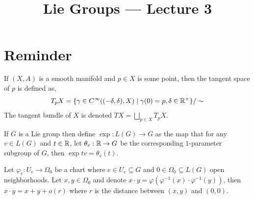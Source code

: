 
\title{Lie Groups --- Lecture 3}
\setcounter{secnumdepth}{2}

\usepackage{fancyhdr}
\pagestyle{fancy}
\renewcommand{\headrulewidth}{0pt}


\maketitle

\section{Reminder}
\begin{definition}
	If $(X, A)$ is a smooth manifold and $p \in X$ is some point, then the tangent space of $p$ is defined as,
	\[
		T_p X
		= \{ \gamma \in C^\infty((-\delta, \delta), X) \mid \gamma(0) = p, \delta \in \mathbb{R}^+ \} / \sim
	\]
	The tangent bundle of $X$ is denoted $T X = \bigsqcup_{p \in X} T_p X$.
\end{definition}
\begin{definition}
	If $G$ is a Lie group then define $\exp : L(G) \to G$ as the map that for any $v \in L(G)$ and $t \in \mathbb{R}$,
	let $\theta_v : \mathbb{R} \to G$ be the corresponding $1$-parameter subgroup of $G$, then $\exp tv = \theta_v(t)$.
\end{definition}
\begin{proposition}
	Let $\varphi_e : U_e \to \Omega_0$ be a chart where $e \in U_e \subseteq G$ and $0 \in \Omega_0 \subseteq L(G)$ open neighborhoods.
	Let $x, y \in \Omega_0$ and denote $x \cdot y = \varphi(\varphi^{-1}(x) \cdot \varphi^{-1}(y))$, then $x \cdot y = x + y + o(r)$ where $r$ is the distance between $(x, y)$ and $(0, 0)$.
\end{proposition}

